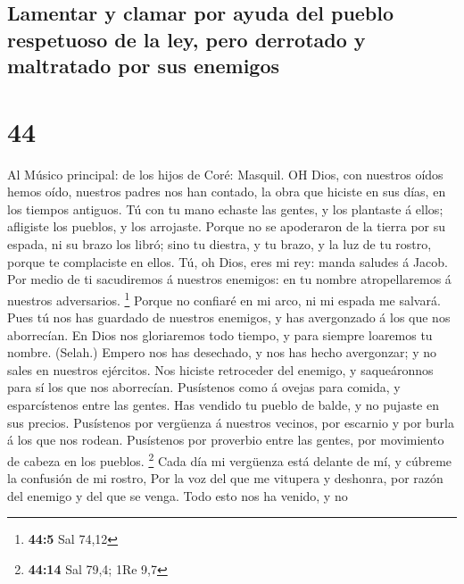 \hypertarget{lamentar-y-clamar-por-ayuda-del-pueblo-respetuoso-de-la-ley-pero-derrotado-y-maltratado-por-sus-enemigos}{%
\subsection{Lamentar y clamar por ayuda del pueblo respetuoso de la ley,
pero derrotado y maltratado por sus
enemigos}\label{lamentar-y-clamar-por-ayuda-del-pueblo-respetuoso-de-la-ley-pero-derrotado-y-maltratado-por-sus-enemigos}}

\hypertarget{section-43}{%
\section{44}\label{section-43}}

 Al Músico principal: de los hijos de Coré: Masquil. OH
Dios, con nuestros oídos hemos oído, nuestros padres nos han contado, la
obra que hiciste en sus días, en los tiempos antiguos.  Tú
con tu mano echaste las gentes, y los plantaste á ellos; afligiste los
pueblos, y los arrojaste.  Porque no se apoderaron de la
tierra por su espada, ni su brazo los libró; sino tu diestra, y tu
brazo, y la luz de tu rostro, porque te complaciste en ellos.
 Tú, oh Dios, eres mi rey: manda saludes á Jacob.
 Por medio de ti sacudiremos á nuestros enemigos: en tu
nombre atropellaremos á nuestros adversarios. \footnote{\textbf{44:5}
  Sal 74,12}  Porque no confiaré en mi arco, ni mi espada me
salvará.  Pues tú nos has guardado de nuestros enemigos, y
has avergonzado á los que nos aborrecían.  En Dios nos
gloriaremos todo tiempo, y para siempre loaremos tu nombre. (Selah.)
 Empero nos has desechado, y nos has hecho avergonzar; y no
sales en nuestros ejércitos.  Nos hiciste retroceder del
enemigo, y saqueáronnos para sí los que nos aborrecían. 
Pusístenos como á ovejas para comida, y esparcístenos entre las gentes.
 Has vendido tu pueblo de balde, y no pujaste en sus
precios.  Pusístenos por vergüenza á nuestros vecinos, por
escarnio y por burla á los que nos rodean.  Pusístenos por
proverbio entre las gentes, por movimiento de cabeza en los pueblos.
\footnote{\textbf{44:14} Sal 79,4; 1Re 9,7}  Cada día mi
vergüenza está delante de mí, y cúbreme la confusión de mi rostro,
 Por la voz del que me vitupera y deshonra, por razón del
enemigo y del que se venga.  Todo esto nos ha venido, y no

